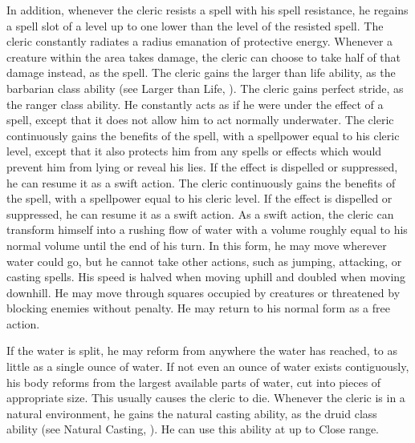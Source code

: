             In addition, whenever the cleric resists a spell with his spell resistance, he regains a spell slot of a level up to one lower than the level of the resisted spell.
            The cleric constantly radiates a \areamed radius emanation of protective energy.
            Whenever a creature within the area takes damage, the cleric can choose to take half of that damage instead, as the  spell.
            The cleric gains the larger than life ability, as the barbarian class ability (see Larger than Life, ).
            The cleric gains perfect stride, as the ranger class ability.
            He constantly acts as if he were under the effect of a  spell, except that it does not allow him to act normally underwater.
             The cleric continuously gains the benefits of the 
            spell, with a spellpower equal to his cleric level, except that it also protects him from any spells or effects which would prevent him from lying or reveal his lies.
            If the effect is dispelled or suppressed, he can resume it as a swift action.
             The cleric continuously gains the benefits of the 
            spell, with a spellpower equal to his cleric level.
            If the effect is dispelled or suppressed, he can resume it as a swift action.
            As a swift action, the cleric can transform himself into a rushing flow of water with a volume roughly equal to his normal volume until the end of his turn.
            In this form, he may move wherever water could go, but he cannot take other actions, such as jumping, attacking, or casting spells.
            His speed is halved when moving uphill and doubled when moving downhill.
            He may move through squares occupied by creatures or threatened by blocking enemies without penalty.
            He may return to his normal form as a free action.
            \par If the water is split, he may reform from anywhere the water has reached, to as little as a single ounce of water.
            If not even an ounce of water exists contiguously, his body reforms from the largest available parts of water, cut into pieces of appropriate size.
            This usually causes the cleric to die.
            Whenever the cleric is in a natural environment, he gains the natural casting ability, as the druid class ability (see Natural Casting, ).
            He can use this ability at up to Close range.

